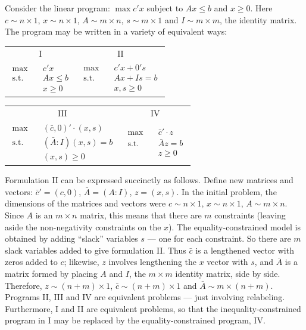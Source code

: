 \begin{original}
Consider the linear program: $\max c' x$ subject to $Ax \le b$ and $x \ge 0$. Here $c \sim n \times 1$, $x \sim n \times 1$, $A \sim m \times n$, $s \sim m \times 1$ and $I \sim m \times m$, the identity matrix. The program may be written in a variety of equivalent ways:

\begin{center}
\begin{tabular}{cc}
I & II \\
$\begin{aligned} \max \quad & c'x \\ \text{s.t.} \quad & Ax \le b \\ & x \ge 0 \end{aligned}$ &
$\begin{aligned} \max \quad & c'x + 0's \\ \text{s.t.} \quad & Ax + Is = b \\ & x, s \ge 0 \end{aligned}$
\end{tabular}
\end{center}

\begin{center}
\begin{tabular}{cc}
III & IV \\
$\begin{aligned} \max \quad & (\bar{c}, 0)' \cdot (x, s) \\ \text{s.t.} \quad & (\bar{A} : I)(x, s) = b \\ & (x, s) \ge 0 \end{aligned}$ &
$\begin{aligned} \max \quad & \bar{c}' \cdot z \\ \text{s.t.} \quad & \bar{A}z = b \\ & z \ge 0 \end{aligned}$
\end{tabular}
\end{center}

Formulation II can be expressed succinctly as follows. Define new matrices and vectors: $\bar{c}' = (c,0)$, $\bar{A} = (A : I)$, $z = (x, s)$. In the initial problem, the dimensions of the matrices and vectors were $c \sim n \times 1$, $x \sim n \times 1$, $A \sim m \times n$. Since $A$ is an $m \times n$ matrix, this means that there are $m$ constraints (leaving aside the non-negativity constraints on the $x$). The equality-constrained model is obtained by adding ``slack'' variables $s$ --- one for each constraint. So there are $m$ slack variables added to give formulation II. Thus $\bar{c}$ is a lengthened vector with zeros added to $c$; likewise, $z$ involves lengthening the $x$ vector with $s$, and $\bar{A}$ is a matrix formed by placing $A$ and $I$, the $m \times m$ identity matrix, side by side. Therefore, $z \sim (n+m) \times 1$, $\bar{c} \sim (n+m) \times 1$ and $\bar{A} \sim m \times (n + m)$. Programs II, III and IV are equivalent problems --- just involving relabeling. Furthermore, I and II are equivalent problems, so that the inequality-constrained program in I may be replaced by the equality-constrained program, IV.
\end{original}
